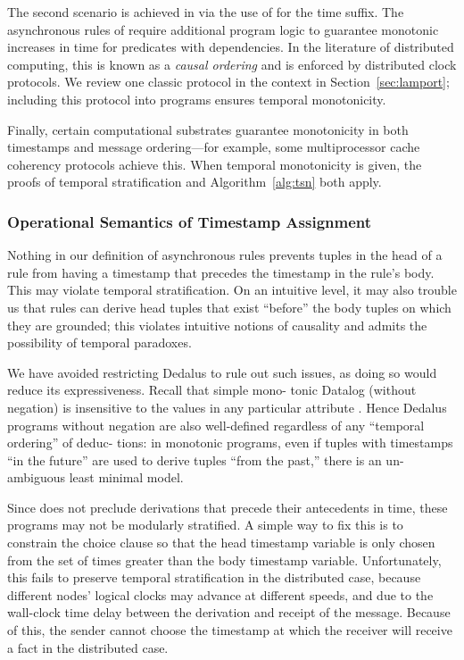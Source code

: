 The second scenario is achieved in \slang via the use of  for the time suffix. The asynchronous rules of \lang require additional program logic to guarantee monotonic increases in time for predicates with dependencies.  In the literature of distributed computing, this is known as a {\em causal ordering} and is enforced by distributed clock protocols.  We review one classic protocol in the \lang context in Section~\ref{sec:lamport}; including this protocol into \lang programs ensures temporal monotonicity.

Finally, certain computational substrates guarantee monotonicity in both timestamps and message ordering---for example, some multiprocessor cache coherency protocols achieve this.  When temporal monotonicity is given, the proofs of temporal stratification and Algorithm~\ref{alg:tsn} both apply.

\subsubsection{Operational Semantics of Timestamp Assignment}

Nothing in our definition of asynchronous rules prevents tuples
in the head of a rule from having a timestamp that precedes the
timestamp in the rule’s body. This may violate temporal stratification.
On an intuitive level, it may also trouble us that rules can
derive head tuples that exist ``before'' the body tuples on which they
are grounded; this violates intuitive notions of causality and admits
the possibility of temporal paradoxes.

We have avoided restricting Dedalus to rule out such issues, as
doing so would reduce its expressiveness. Recall that simple mono-
tonic Datalog (without negation) is insensitive to the values in any
particular attribute  . Hence Dedalus programs without negation are
also well-defined regardless of any ``temporal ordering'' of deduc-
tions: in monotonic programs, even if tuples with timestamps ``in
the future'' are used to derive tuples ``from the past,'' there is an un-
ambiguous least minimal model.


Since  does not preclude derivations that precede their antecedents in time, these programs may not be modularly stratified.  A simple way to fix this is to constrain the choice clause so that the head timestamp variable is only chosen from the set of times greater than the body timestamp variable.  Unfortunately, this fails to preserve temporal stratification in the distributed case, because different nodes' logical clocks may advance at different speeds, and due to the wall-clock time delay between the derivation and receipt of the message.  Because of this, the sender cannot choose the timestamp at which the receiver will receive a  fact in the distributed case. 

